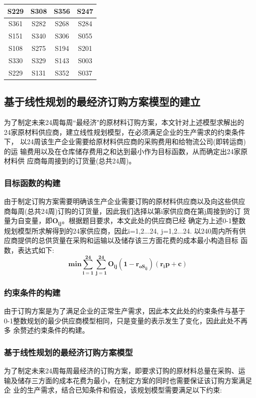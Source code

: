 \documentclass[UTF8]{ctexart}
\begin{document}
\begin{center}
	\begin{tabular}{||c c c c||}
		\hline
		S229 & S308 & S356 & S247      \\ [0.5ex]
		\hline
		S361 & S282 & S268 & S284      \\
		\hline
		S151 & S340 & S306 & S055      \\
		\hline
		S108 & S275 & S194 & S201      \\
		\hline
		S330 & S329 & S143 & S003      \\
		\hline
		S229 & S131 & S352 & S037      \\
		\hline
	\end{tabular}
\end{center}

\subsection{基于线性规划的最经济订购方案模型的建立}
为了制定未来24周每周“最经济"的原材料订购方案，本文针对上述模型求解出的
24家原材料供应商，建立线性规划模型，在必须满足企业的生产需求的约束条件下，
以24周该生产企业需要给原材料供应商的采购费用和给物流公司(即转运商)的运
输费用以及在仓库储存费用之和达到最小作为目标函数，从而确定出24家原材料供
应商每周接到的订货量(总共24周)。
\subsubsection{目标函数的构建}
由于制定订购方案需要明确该生产企业需要订购的原材料供应商以及向这些供应
商每周(总共24周)订购的订货量，因此我们选择以第i家供应商在第j周接到的订
货量为自变量，即$\mathbf{O_{ij}}$。根据题目要求，本文此处的供应商已经
确定为上述0-1整数规划模型所求解得到的24家供应商，因此i=1,2...24, j=1,2...24. 
以240周内所有供应商提供的总供货量在采购和运输以及储存该三方面花费的成本最小构造目标
函数，表达式如下:
\begin{equation}
	\mathbf{min\sum_{i=1}^{24} \sum_{j=1}^{24}O_{ij}(1-r_{oS_{ij}})(r_{i}p+c)}
\end{equation}
\subsubsection{约束条件的构建}
由于订购方案是为了满足企业的正常生产需求，因此本文此处的约束条件与基于
0-1整数规划的最少供应商模型相同，只是变量的表示发生了变化，因此此处不再多
余赘述约束条件的构建。
\subsubsection{基于线性规划的最经济订购方案模型}
为了制定未来24周每周最经济的订购方案，即要求订购的原材料总量在采购、运
输及储存三方面的成本花费为最小，在制定方案的同时也需要保证该订购方案满足企
业的生产需求，结合已知条件和假设，该规划模型需要满足以下约束:
\end{document}
